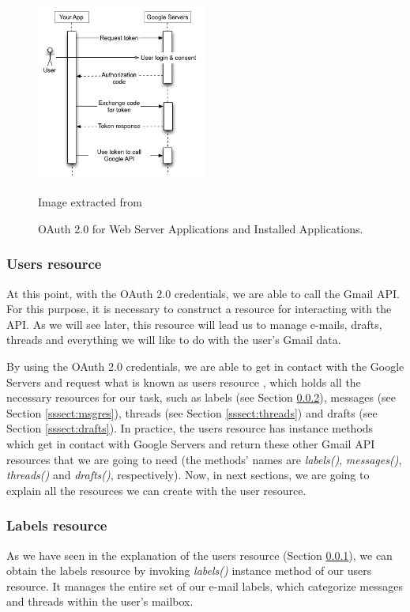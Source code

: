 \begin{figure}[h]
	\centering%
	\includegraphics[width = 0.5\textwidth]{Imagenes/Bitmap/webflow.png}%
	\caption{OAuth 2.0 for Web Server Applications and Installed Applications.}%
	Image extracted from \cite{oauthforgoogle}
	\label{fig:oauth}
\end{figure}

\subsubsection{Users resource}\label{sssect:usersres}
At this point, with the OAuth 2.0 credentials, we are able to call the Gmail API. For this purpose, it is necessary to construct a resource \citep[/v1/reference]{gmailAPI} for interacting with the API. As we will see later, this resource will lead us to manage e-mails, drafts, threads and everything we will like to do with the user's Gmail data.

By using the OAuth 2.0 credentials, we are able to get in contact with the Google Servers and request what is known as users resource \citep[/v1/reference/users]{gmailAPI}, which holds all the necessary resources for our task, such as labels (see Section \ref{sssect:labres}), messages (see Section \ref{sssect:msgres}), threads (see Section \ref{sssect:threads}) and drafts (see Section \ref{sssect:drafts}). In practice, the users resource has instance methods which get in contact with Google Servers and return these other Gmail API resources that we are going to need (the methods' names are \textit{labels()}, \textit{messages()}, \textit{threads()} and \textit{drafts()}, respectively). Now, in next sections, we are going to explain all the resources we can create with the user resource.

\subsubsection{Labels resource}\label{sssect:labres}
As we have seen in the explanation of the users resource (Section \ref{sssect:usersres}), we can obtain the labels resource \citep[/v1/reference/users/labels]{gmailAPI} by invoking \textit{labels()} instance method of our users resource. It manages the entire set of our e-mail labels, which  categorize messages and threads within the user's mailbox.


